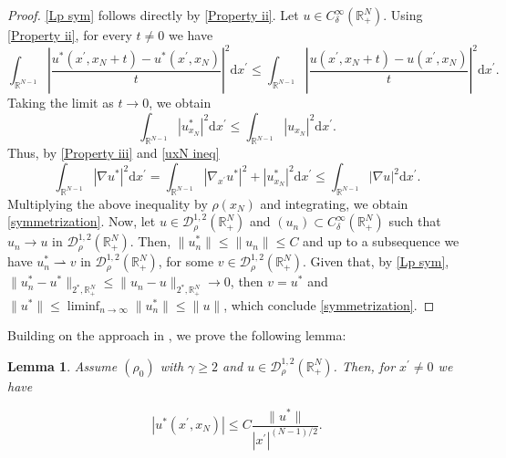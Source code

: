 \documentclass[12pt,reqno]{amsart}
\newtheorem{lemma}[theorem]{Lemma}
\begin{document}
	\begin{proof} \eqref{Lp sym} follows directly by \eqref{Property ii}. Let $u\in C^{\infty}_\delta(\mathds{R}^N_+)$. Using \eqref{Property ii}, for every $t\neq0$ we have  
		\begin{equation*}
			\int_{\mathds{R}^{N-1}}\left|\frac{u^\ast(x^\prime,x_N+t)-u^\ast(x^\prime,x_N)}{t}\right|^2\mathrm{d}x^\prime\leq \int_{\mathds{R}^{N-1}}\left|\frac{u(x^\prime,x_N+t)-u(x^\prime,x_N)}{t}\right|^2\mathrm{d}x^\prime.
		\end{equation*}
		Taking the limit as $t\longrightarrow0$, we obtain 
		\begin{equation}\label{uxN ineq}
			\int_{\mathds{R}^{N-1}}|u^\ast_{x_N}|^2\mathrm{d}x^\prime\leq \int_{\mathds{R}^{N-1}}|u_{x_N}|^2\mathrm{d}x^\prime. 
		\end{equation}
		Thus, by \eqref{Property iii} and \eqref{uxN ineq} 
		\begin{equation*}
			\int_{\mathds{R}^{N-1}}|\nabla u^\ast|^2\mathrm{d}x^\prime= \int_{\mathds{R}^{N-1}}|\nabla_{x^\prime}u^\ast|^2+|u^\ast_{x_N}|^2\mathrm{d}x^\prime\leq  \int_{\mathds{R}^{N-1}}|\nabla u|^2\mathrm{d}x^\prime.
		\end{equation*}
Multiplying the above inequality by $\rho(x_N)$ and integrating, we obtain \eqref{symmetrization}.	
Now, let $u\in \mathcal{D}^{1,2}_\rho(\mathds{R}^N_+)$ and $(u_n)\subset C^\infty_\delta(\mathds{R}^N_+)$ such that $u_n\longrightarrow u$ in $\mathcal{D}^{1,2}_\rho(\mathds{R}^N_+)$. Then, $\|u_n^\ast\|\leq \|u_n\|\leq C$ and up to a subsequence we have
 $u_n^\ast \rightharpoonup v$ in $\mathcal{D}^{1,2}_\rho(\mathds{R}^N_+)$, for some $v\in \mathcal{D}^{1,2}_\rho(\mathds{R}^N_+)$. Given that, by \eqref{Lp sym}, $\|u_n^\ast-u^\ast\|_{2^\ast,\mathds{R}^N_+}\leq \|u_n-u\|_{2^\ast, \mathds{R}^N_+}\longrightarrow 0$, then $v=u^\ast$ and $\|u^\ast\|\leq \liminf_{n\rightarrow \infty} \|u_n^\ast\|\leq \|u\|$, which conclude \eqref{symmetrization}.
\end{proof}

Building on the approach in \cite{PLLions}, we prove the following lemma:
\begin{lemma}\label{Radial Lemma} Assume $(\rho_0)$ with $\gamma\geq2$ and $u \in \mathcal{D}^{1,2}_\rho(\mathds{R}^N_+)$. Then, for $x^\prime\neq 0$ we have 
 
\begin{equation*}%
			|u^\ast(x^\prime,x_N)|\leq C \frac{\|u^\ast\|}{|x^\prime|^{(N-1)/2}}.
		\end{equation*}	
\end{lemma}		
	
\end{document}

